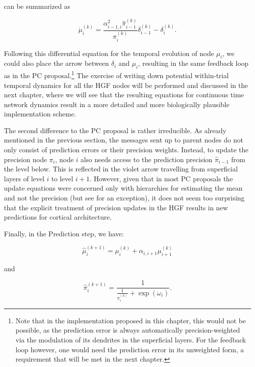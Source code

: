 can be summarized as 

\begin{equation}
	\dot{\mu}_i^{(k)} = \frac{\alpha_{i-1,i}^2 \hat{\pi}_{i-1}^{(k)}}{\pi_i^{(k)}} \delta_{i-1}^{(k)} - \delta_i^{(k)}.
\end{equation}

Following this differential equation for the temporal evolution of node $\mu_i$, we could also place the arrow between $\delta_i$ and $\mu_i$, resulting in the same feedback loop as in the PC proposal.\footnote{Note that in the implementation proposed in this chapter, this would not be possible, as the prediction error is always automatically precision-weighted via the modulation of its dendrites in the superficial layers. For the feedback loop however, one would need the prediction error in its unweighted form, a requirement that will be met in the next chapter.} The exercise of writing down potential within-trial temporal dynamics for all the HGF nodes will be performed and discussed in the next chapter, where we will see that the resulting equations for continuous time network dynamics result in a more detailed and more biologically plausible implementation scheme.

The second difference to the \textsf{PC} proposal is rather irreducible. As already mentioned in the previous section, the messages sent up to parent nodes do not only consist of prediction errors or their precision weights. Instead, to update the precision node $\pi_i$, node $i$ also needs access to the prediction precision $\hat{\pi}_{i-1}$ from the level below. This is reflected in the violet arrow travelling from superficial layers of level $i$ to level $i+1$. However, given that in most \textsf{PC} proposals the update equations were concerned only with hierarchies for estimating the mean and not the precision (but see \cite{Kanai2015} for an exception), it does not seem too surprising that the explicit treatment of precision updates in the HGF results in new predictions for cortical architecture. 

Finally, in the \textsf{Prediction} step, we have:

\begin{equation}
	\hat{\mu}_i^{(k+1)} = \mu_i^{(k)} + \alpha_{i,i+1} \mu_{i+1}^{(k)}
\end{equation}

and

\begin{equation}
	\hat{\pi}_i^{(k+1)} = \frac{1}{\frac{1}{\pi_i^{(k)}} + \exp(\omega_i)}.
\end{equation}

